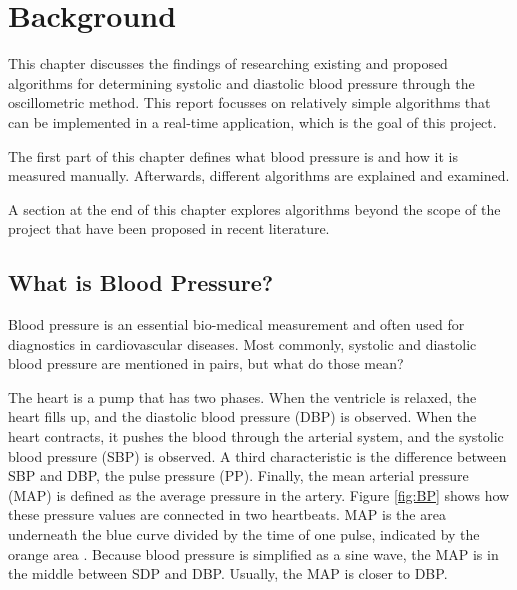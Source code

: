 \chapter{Background}\label{cp:theory}
This chapter discusses the findings of researching existing and proposed algorithms for determining systolic and diastolic blood pressure through the oscillometric method. This report focusses on relatively simple algorithms that can be implemented in a real-time application, which is the goal of this project.

The first part of this chapter defines what blood pressure is and how it is measured manually. Afterwards, different algorithms are explained and examined. 

A section at the end of this chapter explores algorithms beyond the scope of the project that have been proposed in recent literature.

\section{What is Blood Pressure?}

Blood pressure is an essential bio-medical measurement and often used for diagnostics in cardiovascular diseases. Most commonly, systolic and diastolic blood pressure are mentioned in pairs, but what do those mean?

The heart is a pump that has two phases. When the ventricle is relaxed, the heart fills up, and the diastolic blood pressure (DBP) is observed. When the heart contracts, it pushes the blood through the arterial system, and the systolic blood pressure (SBP) is observed. A third characteristic is the difference between SBP and DBP, the pulse pressure (PP). Finally, the mean arterial pressure (MAP) is defined as the average pressure in the artery. Figure \ref{fig:BP} shows how these pressure values are connected in two heartbeats. MAP is the area underneath the blue curve divided by the time of one pulse, indicated by the orange area \citep{Boron2012}. Because blood pressure is simplified as a sine wave, the MAP is in the middle between SDP and DBP. Usually, the MAP is closer to DBP. \paragraph{}


